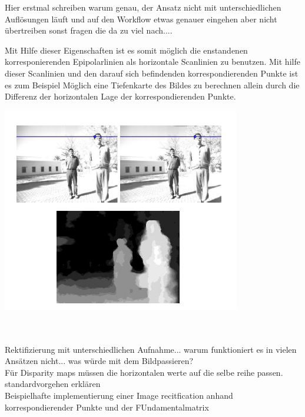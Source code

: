 Hier erstmal schreiben warum genau, der Ansatz nicht mit unterschiedlichen Auflösungen läuft und auf den Workflow etwas genauer eingehen aber nicht übertreiben sonst fragen die da zu viel nach....


Mit Hilfe dieser Eigenschaften ist es somit möglich die enstandenen korresponierenden Epipolarlinien als horizontale Scanlinien zu benutzen\cite{Javier,ZZ}. Mit hilfe dieser Scanlinien und den darauf sich befindenden korrespondierenden Punkte ist es zum Beispiel Möglich eine Tiefenkarte des Bildes zu berechnen allein durch die Differenz der horizontalen Lage der korrespondierenden Punkte\cite{Javier,ZZ}. \\

\begin{minipage}{\linewidth}
	\centering
	\includegraphics[width=.8\linewidth]{images/Disparity.png}
\end{minipage}\\ \\


Rektifizierung mit unterschiedlichen Aufnahme... warum funktioniert es in vielen Ansätzen nicht... was würde mit dem Bildpassieren? \\
Für Disparity maps müssen die horizontalen werte auf die selbe reihe passen. \cite{Javier,Fusiello}\\


standardvorgehen erklären\\

Beispielhafte implementierung einer Image recitfication anhand korrespondierender Punkte und der FUndamentalmatrix\\




